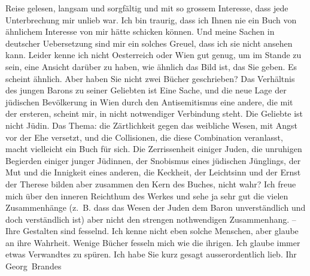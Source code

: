 \begin{ledgroupsized}[t]{13cm}
               Reise gelesen, langsam und sorgfältig und mit so grossem Interesse, dass jede
               Unterbrechung mir unlieb war.\pend
           \pstart
           {\pb}Ich bin traurig, dass ich Ihnen
               nie ein Buch von ähnlichem Interesse von mir hätte schicken können. Und meine Sachen
               in deutscher Uebersetzung sind mir ein solches Greuel, dass ich sie nicht ansehen
               kann.\pend
           \pstart
           Leider kenne ich nicht Oesterreich oder Wien gut genug, um im Stande zu sein, eine Ansicht
               darüber zu haben, wie ähnlich das Bild ist, das Sie geben. Es scheint ähnlich. Aber
               haben Sie nicht zwei Bücher geschrieben? Das Verhältnis des jungen Barons zu seiner Geliebten ist Eine Sache,
               und die {\pb}neue Lage der jüdischen
               Bevölkerung in Wien durch den Antisemitismus eine
               andere, die mit der ersteren, scheint mir, in nicht notwendiger Verbindung steht. Die
               Geliebte ist nicht Jüdin.\pend
           \pstart
           Das Thema: die Zärtlichkeit gegen das weibliche Wesen, mit Angst vor der Ehe
               versetzt, und die Collisionen, die diese Combination veranlasst,  macht vielleicht ein Buch für sich. Die
               Zerrissenheit einiger Juden, die unruhigen Begierden einiger junger Jüdinnen, der
               Snobismus eines jüdischen Jünglings, der {\pb}Mut und die Innigkeit eines
               anderen, die Keckheit, der Leichtsinn und der Ernst der Therese bilden aber zusammen den Kern des
               Buches, nicht wahr? Ich freue mich über den inneren Reichthum des Werkes und sehe ja
               sehr gut die vielen Zusammenhänge (z. B. dass das Wesen der Juden dem Baron
               unverständlich und doch verständlich ist) aber nicht den strengen nothwendigen
               Zusammenhang. – Ihre Gestalten sind fesselnd. Ich kenne nicht eben solche Menschen,
               aber glaube an ihre Wahrheit.\pend
           \pstart
           Wenige Bücher fesseln mich wie die ihrigen. Ich glaube immer etwas Verwandtes zu
               spüren.\pend
           \pstart
           Ich habe Sie kurz gesagt ausserordentlich lieb.\pend
           \pstart Ihr \spacefill\mbox{Georg Brandes}\pend{}
         
         \endnumbering{}\end{ledgroupsized}  \newcommand{\dateiname}{L01777}\newcommand{\titel}{Georg Brandes an Arthur Schnitzler, [25. 6. 1908]}\newcommand{\editorInnen}{Martin Anton Müller und Gerd-Hermann Susen}
      